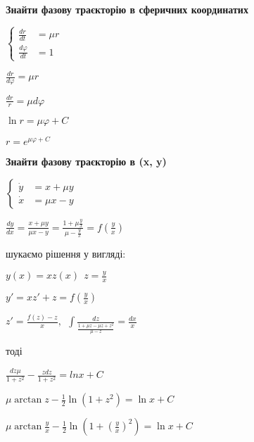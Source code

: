 \textbf{Знайти фазову траєкторію в сферичних координатих }

$\left\{\begin{aligned}
    \frac{dr}{dt} &= \mu r\\
    \frac{d\varphi}{dt} &= 1
\end{aligned}\right.$

$\frac{dr}{d\varphi} = \mu r$

$\frac{dr}{r} = \mu d\varphi$

$\ln r = \mu \varphi + C$

$r = e ^{\mu\varphi + C}$

\textbf{Знайти фазову траєкторію в (x, y) }

$\left\{\begin{aligned}
    \dot{y} &= x + \mu y \\
    \dot{x} &= \mu x - y
\end{aligned}\right.$

$\frac{dy}{dx} = \frac{x+\mu y}{\mu x-y} = \frac{1 + \mu\frac{y}{x}}{\mu - \frac{y}{x}} = f(\frac{y}{x})$

шукаємо рішення у вигляді:

$y(x) = xz(x) \ \ z = \frac{y}{x}$

$y' = xz' + z = f(\frac{y}{x})$

$z' = \frac{f(z) - z}{x}, \ \ \int \frac{dz}{\frac{1 + \mu z - \mu z + z^2}{\mu - z}} =  \frac{dx}{x}$

тоді 

$\frac{dz\mu}{1+z^2} - \frac{zdz}{1+z^2} = lnx + C$

$\mu \arctan z - \frac{1}{2}\ln (1+z^2) = \ln x + C$

$\mu \arctan\frac{y}{x} - \frac{1}{2}\ln(1+(\frac{y}{x})^2) = \ln x +C $